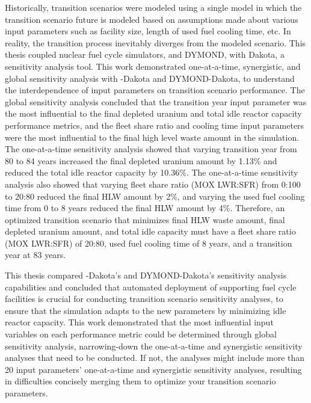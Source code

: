 Historically, transition scenarios were modeled 
using a single model in which the transition scenario future 
is modeled based on assumptions made about various input parameters 
such as facility size, length of used fuel cooling time, etc. 
In reality, the transition process inevitably diverges from the 
modeled scenario. 
This thesis coupled nuclear fuel cycle simulators, \Cyclus and 
DYMOND, with Dakota, a sensitivity analysis tool.
This work demonstrated one-at-a-time, synergistic, and 
global sensitivity analysis with \Cyclus-Dakota and DYMOND-Dakota,
to understand the interdependence of input parameters on 
transition scenario performance. 
The global sensitivity analysis concluded that 
the transition year input parameter was the most influential
to the final depleted uranium and total idle reactor capacity 
performance metrics, and  
the fleet share ratio and cooling time input parameters 
were the most influential to the final high level waste amount in the 
simulation. 
The one-at-a-time sensitivity analysis showed that varying transition 
year from 80 to 84 years increased the final depleted uranium amount by 
1.13\% and reduced the total idle reactor capacity by 10.36\%. 
The one-at-a-time sensitivity analysis also showed that varying 
fleet share ratio (MOX LWR:SFR) from 0:100 to 20:80 reduced the 
final HLW amount by 2\%, and varying the used fuel cooling time from 0 to 
8 years reduced the final HLW amount by 4\%. 
Therefore, an optimized transition scenario that minimizes final 
HLW waste amount, final depleted uranium amount, and total idle capacity 
must have a fleet share ratio (MOX LWR:SFR) of 20:80, used fuel cooling time 
of 8 years, and a transition year at 83 years. 

This thesis compared \Cyclus-Dakota's and DYMOND-Dakota's sensitivity analysis 
capabilities 
and concluded that automated deployment of supporting fuel cycle 
facilities is crucial for conducting transition scenario sensitivity analyses, 
to ensure that the simulation 
adapts to the new parameters by minimizing idle reactor capacity.
This work demonstrated that the most influential input variables 
on each performance 
metric could be determined through global sensitivity 
analysis, narrowing-down the one-at-a-time and 
synergistic sensitivity analyses that need to be conducted.  
If not, the analyses might include more than 20 input parameters' 
one-at-a-time and synergistic sensitivity analyses, 
resulting in difficulties concisely merging them to optimize your 
transition scenario parameters.

